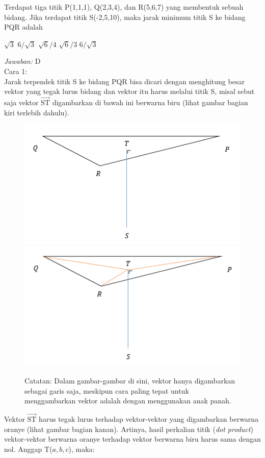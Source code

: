 \documentclass[11pt,fleqn]{exam}
\begin{document}
\begin{questions}
\question Terdapat tiga titik P(1,1,1), Q(2,3,4), dan R(5,6,7) yang membentuk sebuah bidang. Jika terdapat titik S(-2,5,10), maka jarak minimum titik S ke bidang PQR adalah
\begin{choices}
\choice $\sqrt{3}$
\choice $6/\sqrt{3}$
\choice $\sqrt{6}/4$
\choice $\sqrt{6}/3$
\choice $6/\sqrt{3}$
\end{choices}

\textit{Jawaban: } D\\
Cara 1:\\
Jarak terpendek titik S ke bidang PQR bisa dicari dengan menghitung besar vektor yang tegak lurus bidang dan vektor itu harus melalui titik S, misal sebut saja vektor $\overrightarrow{\text {ST}}$ digambarkan di bawah ini berwarna biru (lihat gambar bagian kiri terlebih dahulu).
\begin{figure}[h!]
\centering
\includegraphics[scale=0.65]{pqr1.PNG}
\includegraphics[scale=0.65]{pqr2.PNG}
\caption*{Catatan: Dalam gambar-gambar di sini, vektor hanya digambarkan sebagai garis saja, meskipun cara paling tepat untuk menggambarkan vektor adalah dengan menggunakan anak panah.}
\end{figure}
Vektor $\overrightarrow{\text {ST}}$ harus tegak lurus terhadap vektor-vektor yang digambarkan berwarna oranye (lihat gambar bagian kanan). Artinya, hasil perkalian titik (\textit{dot product}) vektor-vektor berwarna oranye terhadap vektor berwarna biru harus sama dengan nol. Anggap T($a,b,c$), maka:\\

\end{questions}
\end{document}
